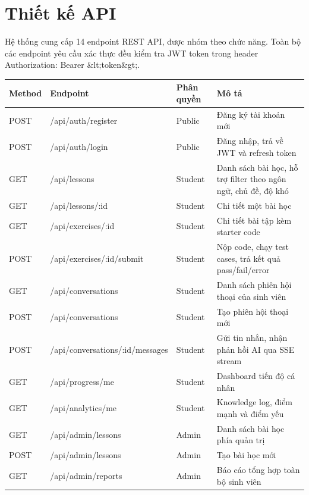 \documentclass[../main.tex]{subfiles}
\begin{document}
\section{Thiết kế API}

Hệ thống cung cấp 14 endpoint REST API, được nhóm theo chức năng. Toàn bộ các endpoint yêu cầu xác thực đều kiểm tra JWT token trong header Authorization: Bearer \&lt;token\&gt;.


{
\renewcommand{\arraystretch}{1.5}
\begin{tabularx}{\textwidth}{|p{2.0cm}|X|p{2.0cm}|>{\raggedright\arraybackslash}X|}
\caption{Danh sách endpoint REST API}
\label{tab:danh-sach-endpoint-rest-api}
\\
\hline
\textbf{Method} & \textbf{Endpoint} & \textbf{Phân quyền} & \textbf{Mô tả} \\
\hline
POST & /\allowbreak api/\allowbreak auth/\allowbreak register & Public & Đăng ký tài khoản mới \\
\hline
POST & /\allowbreak api/\allowbreak auth/\allowbreak login & Public & Đăng nhập, trả về JWT và refresh token \\
\hline
GET & /\allowbreak api/\allowbreak lessons & Student & Danh sách bài học, hỗ trợ filter theo ngôn ngữ, chủ đề, độ khó \\
\hline
GET & /\allowbreak api/\allowbreak lessons/\allowbreak :id & Student & Chi tiết một bài học \\
\hline
GET & /\allowbreak api/\allowbreak exercises/\allowbreak :id & Student & Chi tiết bài tập kèm starter code \\
\hline
POST & /\allowbreak api/\allowbreak exercises/\allowbreak :id/\allowbreak submit & Student & Nộp code, chạy test cases, trả kết quả pass/fail/error \\
\hline
GET & /\allowbreak api/\allowbreak conversations & Student & Danh sách phiên hội thoại của sinh viên \\
\hline
POST & /\allowbreak api/\allowbreak conversations & Student & Tạo phiên hội thoại mới \\
\hline
POST & /\allowbreak api/\allowbreak conversations/\allowbreak :id/\allowbreak messages & Student & Gửi tin nhắn, nhận phản hồi AI qua SSE stream \\
\hline
GET & /\allowbreak api/\allowbreak progress/\allowbreak me & Student & Dashboard tiến độ cá nhân \\
\hline
GET & /\allowbreak api/\allowbreak analytics/\allowbreak me & Student & Knowledge log, điểm mạnh và điểm yếu \\
\hline
GET & /\allowbreak api/\allowbreak admin/\allowbreak lessons & Admin & Danh sách bài học phía quản trị \\
\hline
POST & /\allowbreak api/\allowbreak admin/\allowbreak lessons & Admin & Tạo bài học mới \\
\hline
GET & /\allowbreak api/\allowbreak admin/\allowbreak reports & Admin & Báo cáo tổng hợp toàn bộ sinh viên \\
\hline
\end{tabularx}
}
\end{document}
